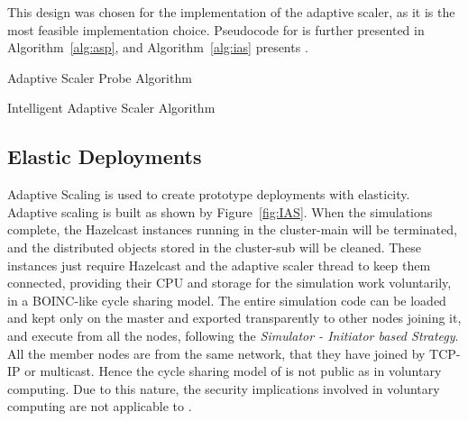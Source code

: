 This design was chosen for the implementation of the adaptive scaler, as it is the most feasible implementation choice. Pseudocode for  is further presented in Algorithm~\ref{alg:asp}, and Algorithm~\ref{alg:ias} presents .
\begin{algorithm}[h]
  \caption{Adaptive Scaler Probe Algorithm}
\label{alg:asp}
  \begin{algorithmic}
\State  {}
\EndProcedure
\Statex
{}
\State  {}
\EndProcedure
\Statex
{}
\While{  }
\State 
\If{}
\State 
\State  {}
\State 
\ElsIf{}
\State 
\State 
\State 
\EndIf
    \EndWhile  
\EndProcedure
  \end{algorithmic}
\end{algorithm}

\begin{algorithm}[h]
  \caption{Intelligent Adaptive Scaler Algorithm}
\label{alg:ias}
  \begin{algorithmic}
 
\State 
\If{}
\State 
\EndIf
\If{}
\State 
\EndIf
\EndProcedure
\Statex
{}
\While{  }
\State 
\If{}

\If{}
\State  {}
\State  {}
\State 
\State 
\State
\If{} 
\State 
\State 
\State  {}
\EndIf
\EndIf

\ElsIf{}
\State 
\State 
\State 
\State 
\State
\If{}
\State 
\State 
\State 
\EndIf
\EndIf



    \EndWhile  
\EndProcedure
  \end{algorithmic}
\end{algorithm}
 
\subsection{Elastic Deployments}
Adaptive Scaling is used to create prototype deployments with elasticity. Adaptive scaling is built as shown by Figure~\ref{fig:IAS}. When the simulations complete, the Hazelcast instances running in the cluster-main will be terminated, and the distributed objects stored in the cluster-sub will be cleaned. These instances just require Hazelcast and the adaptive scaler thread to keep them connected, providing their CPU and storage for the  simulation work voluntarily, in a BOINC-like cycle sharing model. The entire simulation code can be loaded and kept only on the master and exported transparently to other nodes joining it, and execute from all the nodes, following the \textit{Simulator - Initiator based Strategy}. All the member nodes are from the same network, that they have joined by TCP-IP or multicast. Hence the cycle sharing model of  is not public as in voluntary computing. Due to this nature, the security implications involved in voluntary computing are not applicable to .

